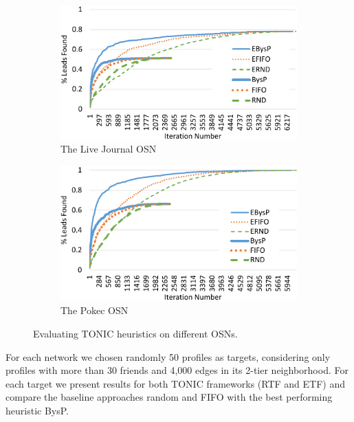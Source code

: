 \documentclass[journal]{IEEEtran}
\begin{document}
\begin{figure}
\centering
\begin{subfigure}{.5\textwidth}
  \centering
\includegraphics[width=\linewidth]{LiveJournal_cropped}
\caption{The Live Journal OSN}
\label{fig:live-journal}
\end{subfigure}%
\begin{subfigure}{.5\textwidth}
  \centering
\includegraphics[width=\linewidth]{Pokec_cropped}
\caption{The Pokec OSN}
\label{fig:pokec}
\end{subfigure}
\caption{Evaluating TONIC heuristics on different OSNs.}
\label{fig:extra-osns}
\end{figure}

For each network we chosen randomly 50 profiles as targets, considering only profiles with more than 30 friends and 4,000 edges in its 2-tier neighborhood. For each target we present results for both TONIC frameworks (RTF and ETF)
and compare the baseline approaches random and FIFO with the best performing heuristic BysP. 
\end{document}
